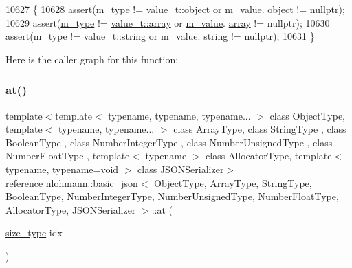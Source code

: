 \begin{DoxyCode}
10627     \{
10628         assert(\hyperlink{classnlohmann_1_1basic__json_a91990b60d7d4d67968a2c1db677536e7}{m\_type} != \hyperlink{namespacenlohmann_1_1detail_a1ed8fc6239da25abcaf681d30ace4985aa8cfde6331bd59eb2ac96f8911c4b666}{value\_t::object} or \hyperlink{classnlohmann_1_1basic__json_aeb0814f76966f99290cb29e127c90a77}{m\_value}.
      \hyperlink{unionnlohmann_1_1basic__json_1_1json__value_a4a2209bb26e7088cd36bf24824ab5521}{object} != \textcolor{keyword}{nullptr});
10629         assert(\hyperlink{classnlohmann_1_1basic__json_a91990b60d7d4d67968a2c1db677536e7}{m\_type} != \hyperlink{namespacenlohmann_1_1detail_a1ed8fc6239da25abcaf681d30ace4985af1f713c9e000f5d3f280adbd124df4f5}{value\_t::array} or \hyperlink{classnlohmann_1_1basic__json_aeb0814f76966f99290cb29e127c90a77}{m\_value}.
      \hyperlink{unionnlohmann_1_1basic__json_1_1json__value_a7947687f3ae1911d6e9847e2b3226157}{array} != \textcolor{keyword}{nullptr});
10630         assert(\hyperlink{classnlohmann_1_1basic__json_a91990b60d7d4d67968a2c1db677536e7}{m\_type} != \hyperlink{namespacenlohmann_1_1detail_a1ed8fc6239da25abcaf681d30ace4985ab45cffe084dd3d20d928bee85e7b0f21}{value\_t::string} or \hyperlink{classnlohmann_1_1basic__json_aeb0814f76966f99290cb29e127c90a77}{m\_value}.
      \hyperlink{unionnlohmann_1_1basic__json_1_1json__value_a9856fb4271b50d738e14c5a9a2f05118}{string} != \textcolor{keyword}{nullptr});
10631     \}
\end{DoxyCode}
Here is the caller graph for this function\+:
\mbox{\label{classnlohmann_1_1basic__json_a73ae333487310e3302135189ce8ff5d8}} 
\subsubsection{\texorpdfstring{at()}{at()}\hspace{0.1cm}{\footnotesize\ttfamily [1/6]}}
{\footnotesize\ttfamily template$<$template$<$ typename, typename, typename... $>$ class Object\+Type, template$<$ typename, typename... $>$ class Array\+Type, class String\+Type , class Boolean\+Type , class Number\+Integer\+Type , class Number\+Unsigned\+Type , class Number\+Float\+Type , template$<$ typename $>$ class Allocator\+Type, template$<$ typename, typename=void $>$ class J\+S\+O\+N\+Serializer$>$ \\
\hyperlink{classnlohmann_1_1basic__json_ac6a5eddd156c776ac75ff54cfe54a5bc}{reference} \hyperlink{classnlohmann_1_1basic__json}{nlohmann\+::basic\+\_\+json}$<$ Object\+Type, Array\+Type, String\+Type, Boolean\+Type, Number\+Integer\+Type, Number\+Unsigned\+Type, Number\+Float\+Type, Allocator\+Type, J\+S\+O\+N\+Serializer $>$\+::at (\begin{DoxyParamCaption}\item[{\hyperlink{classnlohmann_1_1basic__json_a39f2cd0b58106097e0e67bf185cc519b}{size\+\_\+type}}]{idx }\end{DoxyParamCaption})\hspace{0.3cm}{\ttfamily [inline]}}




